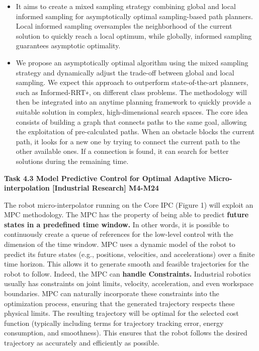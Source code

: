 \begin{longtable}[]
{\begin{minipage}[t]{\linewidth}
\begin{itemize}
\item
  It aims to create a mixed sampling strategy combining global and local
  informed sampling for asymptotically optimal sampling-based path
  planners. Local informed sampling oversamples the neighborhood of the
  current solution to quickly reach a local optimum, while globally,
  informed sampling guarantees asymptotic optimality.
\item
  We propose an asymptotically optimal algorithm using the mixed
  sampling strategy and dynamically adjust the trade-off between global
  and local sampling. We expect this approach to outperform
  state-of-the-art planners, such as Informed-RRT∗, on different class
  problems. The methodology will then be integrated into an anytime
  planning framework to quickly provide a suitable solution in complex,
  high-dimensional search spaces. The core idea consists of building a
  graph that connects paths to the same goal, allowing the exploitation
  of pre-calculated paths. When an obstacle blocks the current path, it
  looks for a new one by trying to connect the current path to the other
  available ones. If a connection is found, it can search for better
  solutions during the remaining time.
\end{itemize}

\textbf{Task 4.3 Model Predictive Control for Optimal Adaptive
Micro-interpolation {[}Industrial Research{]} M4-M24}

The robot micro-interpolator running on the Core IPC (Figure 1) will
exploit an MPC methodology. The MPC has the property of being able to
predict \textbf{future states in a predefined time window.} In other
words, it is possible to continuously create a queue of references for
the low-level control with the dimension of the time window. MPC uses a
dynamic model of the robot to predict its future states (e.g.,
positions, velocities, and accelerations) over a finite time horizon.
This allows it to generate smooth and feasible trajectories for the
robot to follow. Indeed, the MPC can \textbf{handle Constraints.}
Industrial robotics usually has constraints on joint limits, velocity,
acceleration, and even workspace boundaries. MPC can naturally
incorporate these constraints into the optimization process, ensuring
that the generated trajectory respects these physical limits. The
resulting trajectory will be optimal for the selected cost function
(typically including terms for trajectory tracking error, energy
consumption, and smoothness). This ensures that the robot follows the
desired trajectory as accurately and efficiently as possible.


\end{minipage}}
\end{longtable}
